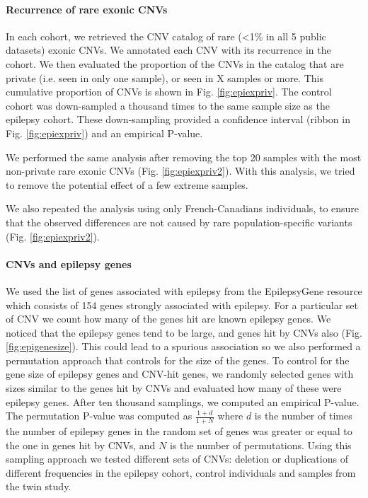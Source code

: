 \paragraph{Recurrence of rare exonic CNVs}
In each cohort, we retrieved the CNV catalog of rare (<1\% in all 5 public datasets) exonic CNVs.
We annotated each CNV with its recurrence in the cohort.
We then evaluated the proportion of the CNVs in the catalog that are private (i.e. seen in only one sample), or seen in X samples or more.
This cumulative proportion of CNVs is shown in Fig. \ref{fig:epiexpriv}.
The control cohort was down-sampled a thousand times to the same sample size as the epilepsy cohort.
These down-sampling provided a confidence interval (ribbon in Fig. \ref{fig:epiexpriv}) and an empirical P-value.

We performed the same analysis after removing the top 20 samples with the most non-private rare exonic CNVs (Fig. \ref{fig:epiexpriv2}).
With this analysis, we tried to remove the potential effect of a few extreme samples.

We also repeated the analysis using only French-Canadians individuals, to ensure that the observed differences are not caused by rare population-specific variants (Fig. \ref{fig:epiexpriv2}).


\paragraph{CNVs and epilepsy genes}
We used the list of genes associated with epilepsy from the EpilepsyGene resource\citep{Ran2015} which consists of 154 genes strongly associated with epilepsy.
For a particular set of CNV we count how many of the genes hit are known epilepsy genes.
We noticed that the epilepsy genes tend to be large, and genes hit by CNVs also (Fig. \ref{fig:epigenesize}).
This could lead to a spurious association so we also performed a permutation approach that controls for the size of the genes.
To control for the gene size of epilepsy genes and CNV-hit genes, we randomly selected genes with sizes similar to the genes hit by CNVs and evaluated how many of these were epilepsy genes.
After ten thousand samplings, we computed an empirical P-value.
The permutation P-value was computed as $\frac{1+d}{1+N}$ where $d$ is the number of times the number of epilepsy genes in the random set of genes was greater or equal to the one in genes hit by CNVs, and $N$ is the number of permutations.
Using this sampling approach we tested different sets of CNVs: deletion or duplications of different frequencies in the epilepsy cohort, control individuals and samples from the twin study.

